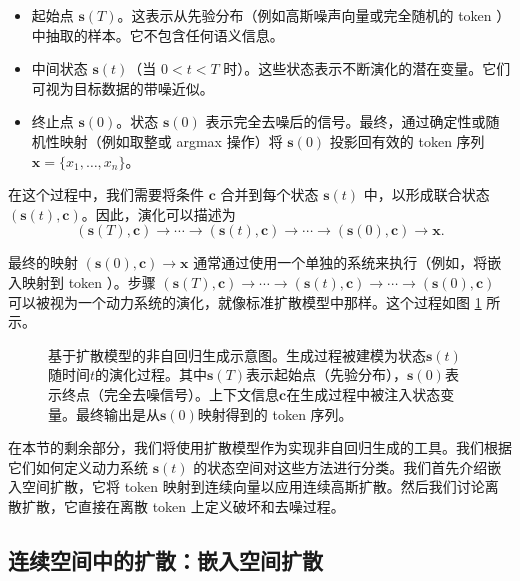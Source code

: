\documentclass[UTF8,a4paper,zihao=-4,oneside,openany]{ctexbook}
\makeatletter
\newcommand{\AMLFigure}[2][0.96\linewidth]{%
  \begingroup
  \let\AtBeginDocument\@gobble
  \endgroup
}
\makeatother
\begin{document}
\begin{itemize}
\item 起始点 $\mathbf{s}(T)$。这表示从先验分布（例如高斯噪声向量或完全随机的 token ）中抽取的样本。它不包含任何语义信息。
\item 中间状态 $\mathbf{s}(t)$（当 $0 < t < T$ 时）。这些状态表示不断演化的潜在变量。它们可视为目标数据的带噪近似。
\item 终止点 $\mathbf{s}(0)$。状态 $\mathbf{s}(0)$ 表示完全去噪后的信号。最终，通过确定性或随机性映射（例如取整或 argmax 操作）将 $\mathbf{s}(0)$ 投影回有效的 token 序列 $\mathbf{x} = \{x_1, \dots, x_n\}$。
\end{itemize}

在这个过程中，我们需要将条件 $\mathbf{c}$ 合并到每个状态 $\mathbf{s}(t)$ 中，以形成联合状态 $(\mathbf{s}(t), \mathbf{c})$。因此，演化可以描述为
\begin{equation}
(\mathbf{s}(T), \mathbf{c}) \to \cdots \to (\mathbf{s}(t), \mathbf{c}) \to \cdots \to (\mathbf{s}(0), \mathbf{c}) \to \mathbf{x}.
\end{equation}

最终的映射 $(\mathbf{s}(0), \mathbf{c}) \to \mathbf{x}$ 通常通过使用一个单独的系统来执行（例如，将嵌入映射到 token ）。步骤 $(\mathbf{s}(T), \mathbf{c}) \to \cdots \to (\mathbf{s}(t), \mathbf{c}) \to \cdots \to (\mathbf{s}(0), \mathbf{c})$ 可以被视为一个动力系统的演化，就像标准扩散模型中那样。这个过程如图 \ref{fig:diffiusion-modeling-as-nar-generation} 所示。

\begin{figure}[!t]
\centering
\AMLFigure{figure-diffiusion-modeling-as-nar-generation}
\caption{基于扩散模型的非自回归生成示意图。生成过程被建模为状态$\mathbf{s}(t)$随时间$t$的演化过程。其中$\mathbf{s}(T)$表示起始点（先验分布），$\mathbf{s}(0)$表示终点（完全去噪信号）。上下文信息$\mathbf{c}$在生成过程中被注入状态变量。最终输出是从$\mathbf{s}(0)$映射得到的 token 序列。}
\label{fig:diffiusion-modeling-as-nar-generation}
\end{figure}

在本节的剩余部分，我们将使用扩散模型作为实现非自回归生成的工具。我们根据它们如何定义动力系统 $\mathbf{s}(t)$ 的状态空间对这些方法进行分类。我们首先介绍嵌入空间扩散，它将 token 映射到连续向量以应用连续高斯扩散。然后我们讨论离散扩散，它直接在离散 token 上定义破坏和去噪过程。
\subsection{连续空间中的扩散：嵌入空间扩散}
\end{document}
